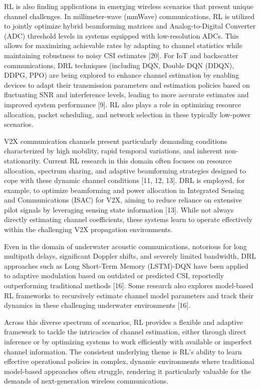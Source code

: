\documentclass[journal,twocolumn]{IEEEtran}
\begin{document}
RL is also finding applications in emerging wireless scenarios that present unique channel challenges. In millimeter-wave (mmWave) communications, RL is utilized to jointly optimize hybrid beamforming matrices and Analog-to-Digital Converter (ADC) threshold levels in systems equipped with low-resolution ADCs. This allows for maximizing achievable rates by adapting to channel statistics while maintaining robustness to noisy CSI estimates [20]. For IoT and backscatter communications, DRL techniques (including DQN, Double DQN (DDQN), DDPG, PPO) are being explored to enhance channel estimation by enabling devices to adapt their transmission parameters and estimation policies based on fluctuating SNR and interference levels, leading to more accurate estimates and improved system performance [9]. RL also plays a role in optimizing resource allocation, packet scheduling, and network selection in these typically low-power scenarios.

V2X communication channels present particularly demanding conditions characterized by high mobility, rapid temporal variations, and inherent non-stationarity. Current RL research in this domain often focuses on resource allocation, spectrum sharing, and adaptive beamforming strategies designed to cope with these dynamic channel conditions [11, 12, 13]. DRL is employed, for example, to optimize beamforming and power allocation in Integrated Sensing and Communications (ISAC) for V2X, aiming to reduce reliance on extensive pilot signals by leveraging sensing state information [13]. While not always directly estimating channel coefficients, these systems learn to operate effectively within the challenging V2X propagation environments.

Even in the domain of underwater acoustic communications, notorious for long multipath delays, significant Doppler shifts, and severely limited bandwidth, DRL approaches such as Long Short-Term Memory (LSTM)-DQN have been applied to adaptive modulation based on outdated or predicted CSI, reportedly outperforming traditional methods [16]. Some research also explores model-based RL frameworks to recursively estimate channel model parameters and track their dynamics in these challenging underwater environments [16].

Across this diverse spectrum of scenarios, RL provides a flexible and adaptive framework to tackle the intricacies of channel estimation, either through direct inference or by optimizing systems to work efficiently with available or imperfect channel information. The consistent underlying theme is RL's ability to learn effective operational policies in complex, dynamic environments where traditional model-based approaches often struggle, rendering it particularly valuable for the demands of next-generation wireless communications.
\end{document}
